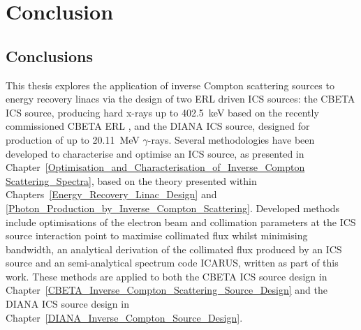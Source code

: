 \documentclass[../main.tex]{subfiles}
\begin{document}
\chapter{Conclusion}
\label{Conclusion} %

\section{Conclusions}

This thesis explores the application of inverse Compton scattering sources to energy recovery linacs via the design of two ERL driven ICS sources: the CBETA ICS source, producing hard x-rays up to 402.5~\si{\kilo\electronvolt} based on the recently commissioned CBETA ERL \cite{bartnik2020cbeta}, and the DIANA ICS source, designed for production of up to 20.11~\si{\mega\electronvolt} $\gamma$-rays. Several methodologies have been developed to characterise and optimise an ICS source, as presented in Chapter~\ref{Optimisation_and_Characterisation_of_Inverse_Compton Scattering_Spectra}, based on the theory presented within Chapters~\ref{Energy_Recovery_Linac_Design} and \ref{Photon_Production_by_Inverse_Compton_Scattering}. Developed methods include optimisations of the electron beam and collimation parameters at the ICS source interaction point to maximise collimated flux whilst minimising bandwidth, an analytical derivation of the collimated flux produced by an ICS source and an semi-analytical spectrum code \textsc{ICARUS}, written as part of this work. These methods are applied to both the CBETA ICS source design in Chapter~\ref{CBETA_Inverse_Compton_Scattering_Source_Design} and the DIANA ICS source design in Chapter~\ref{DIANA_Inverse_Compton_Source_Design}.
\end{document}
